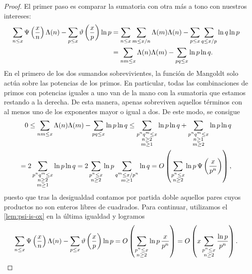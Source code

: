 \begin{proof}
  El primer paso es comparar la sumatoria con otra m\'as a tono con nuestros intereses:
  \begin{align*}
    \sum_{n \leq x} \Psi \left( \frac{x}{n} \right) \Lambda(n)
    - \sum_{p \leq x} \vartheta \left( \frac{x}{p} \right) \ln p
    &= \sum_{n \leq x} \sum_{m \leq x/n} \Lambda(m) \Lambda(n)
    - \sum_{p \leq x} \sum_{q \leq x / p} \ln q \ln p \\
    &= \sum_{nm \leq x} \Lambda(n) \Lambda(m)
    - \sum_{pq \leq x} \ln p \ln q.
  \end{align*}
  En el primero de los dos sumandos sobrevivientes,
  la funci\'on de Mangoldt solo act\'ua sobre las potencias de los primos.
  En particular, todas las combinaciones de primos con potencias iguales a uno
  van de la mano con la sumatoria que estamos restando a la derecha.
  De esta manera, apenas sobreviven aquellos t\'erminos
  con al menos uno de los exponentes mayor o igual a dos.
  De este modo, se consigue
  \begin{align*}
    0 \leq \sum_{nm \leq x} \Lambda(n) \Lambda(m)
    - \sum_{pq \leq x} \ln p \ln q
    \leq \sum_{\substack{p^n q^m \leq x \\ n \geq 2 \\ m \geq 1}} \ln p \ln q
    + \sum_{\substack{p^n q^m \leq x \\ n \geq 1 \\ m \geq 2}} \ln p \ln q \\
    = 2 \sum_{\substack{p^n q^m \leq x \\ n \geq 2 \\ m \geq 1}} \ln p \ln q
    = 2 \sum_{\substack{p^n \leq x \\ n \geq 2}} \ln p \sum_{\substack{q^m \leq x / p^n \\ m \geq 1}} \ln q
    = O\left( \sum_{\substack{p^n \leq x \\ n \geq 2}} \ln p \, \Psi\left( \frac{x}{p^n} \right) \right),
  \end{align*}
  puesto que tras la desigualdad contamos por partida doble
  aquellos pares cuyos productos no son enteros libres de cuadrados.
  Para continuar, utilizamos el \cref{lem:psi-is-ox} en la \'ultima igualdad y logramos 
  \[
    \sum_{n \leq x} \Psi\left( \frac{x}{n} \right)\Lambda(n)
    - \sum_{p \leq x} \vartheta\left( \frac{x}{p} \right) \ln p
    = O\left( \sum_{\substack{p^n \leq x \\ n \geq 2}} \ln p \, \frac{x}{p^n} \right)
    = O\left( x \sum_{\substack{p^n \leq x \\ n \geq 2}} \frac{\ln p}{p^n} \right).
  \]
  

\end{proof}
